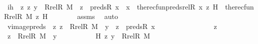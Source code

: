 \begin{isabellebody}
\isanewline
\ \ \ \ \isamarkupfalse%
\ ih\ {\isacharcolon}{\kern0pt}\ {\isachardoublequoteopen}{\isasymAnd}z{\isachardot}{\kern0pt}\ {\isasymlangle}z{\isacharcomma}{\kern0pt}\ y{\isasymrangle}\ {\isasymin}\ Rrel{\isacharparenleft}{\kern0pt}R{\isacharcomma}{\kern0pt}\ M{\isacharparenright}{\kern0pt}\ {\isasymLongrightarrow}\ z\ {\isasymin}\ preds{\isacharparenleft}{\kern0pt}R{\isacharcomma}{\kern0pt}\ x{\isacharparenright}{\kern0pt}\ {\isasymunion}\ {\isacharbraceleft}{\kern0pt}x{\isacharbraceright}{\kern0pt}\ {\isasymLongrightarrow}\ the{\isacharunderscore}{\kern0pt}recfun{\isacharparenleft}{\kern0pt}preds{\isacharunderscore}{\kern0pt}rel{\isacharparenleft}{\kern0pt}R{\isacharcomma}{\kern0pt}\ x{\isacharparenright}{\kern0pt}{\isacharcomma}{\kern0pt}\ z{\isacharcomma}{\kern0pt}\ H{\isacharparenright}{\kern0pt}\ {\isacharequal}{\kern0pt}\ the{\isacharunderscore}{\kern0pt}recfun{\isacharparenleft}{\kern0pt}Rrel{\isacharparenleft}{\kern0pt}R{\isacharcomma}{\kern0pt}\ M{\isacharparenright}{\kern0pt}{\isacharcomma}{\kern0pt}\ z{\isacharcomma}{\kern0pt}\ H{\isacharparenright}{\kern0pt}{\isachardoublequoteclose}\isanewline
\ \ \ \ \ \ \isamarkupfalse%
\ assms{}\ \isamarkupfalse%
\ auto\isanewline
\isanewline
\ \ \ \ \isamarkupfalse%
\ vimage{\isacharunderscore}{\kern0pt}preds\ {\isacharcolon}{\kern0pt}\ {\isachardoublequoteopen}{\isasymAnd}z{\isachardot}{\kern0pt}\ z\ {\isasymin}\ Rrel{\isacharparenleft}{\kern0pt}R{\isacharcomma}{\kern0pt}\ M{\isacharparenright}{\kern0pt}\ {\isacharminus}{\kern0pt}{\isacharbackquote}{\kern0pt}{\isacharbackquote}{\kern0pt}\ {\isacharbraceleft}{\kern0pt}y{\isacharbraceright}{\kern0pt}\ {\isasymLongrightarrow}\ z\ {\isasymin}\ preds{\isacharparenleft}{\kern0pt}R{\isacharcomma}{\kern0pt}\ x{\isacharparenright}{\kern0pt}{\isachardoublequoteclose}\ \isanewline
\ \ \ \ \isamarkupfalse%
\ {\isacharminus}{\kern0pt}\ \isanewline
\ \ \ \ \ \ \isamarkupfalse%
\ z\ \isamarkupfalse%
\ {\isachardoublequoteopen}z\ {\isasymin}\ Rrel{\isacharparenleft}{\kern0pt}R{\isacharcomma}{\kern0pt}\ M{\isacharparenright}{\kern0pt}\ {\isacharminus}{\kern0pt}{\isacharbackquote}{\kern0pt}{\isacharbackquote}{\kern0pt}\ {\isacharbraceleft}{\kern0pt}y{\isacharbraceright}{\kern0pt}{\isachardoublequoteclose}\ \isanewline
\ \ \ \ \ \ \isamarkupfalse%
\ \isamarkupfalse%
\ H{\isacharcolon}{\kern0pt}\ {\isachardoublequoteopen}{\isacharless}{\kern0pt}z{\isacharcomma}{\kern0pt}\ y{\isachargreater}{\kern0pt}\ {\isasymin}\ Rrel{\isacharparenleft}{\kern0pt}R{\isacharcomma}{\kern0pt}\ M{\isacharparenright}{\kern0pt}{\isachardoublequoteclose}\ \isamarkupfalse%

\end{isabellebody}
